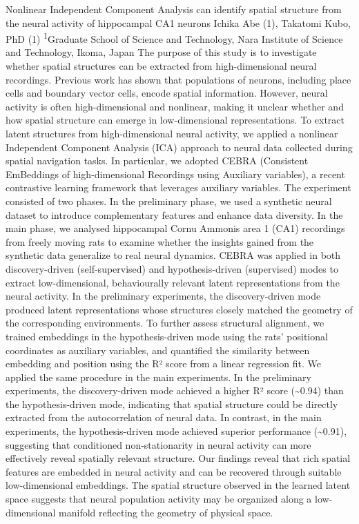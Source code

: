 \makeabstract
{
Nonlinear Independent Component Analysis can identify spatial structure from the neural activity of hippocampal CA1 neurons
}
{
Ichika Abe (1), Takatomi Kubo, PhD (1)
}
{
\textsuperscript{1}Graduate School of Science and Technology, Nara Institute of Science and Technology, Ikoma, Japan
}
{
The purpose of this study is to investigate whether spatial structures can be extracted from high-dimensional neural recordings. Previous work has shown that populations of neurons, including place cells and boundary vector cells, encode spatial information. However, neural activity is often high-dimensional and nonlinear, making it unclear whether and how spatial structure can emerge in low-dimensional representations. To extract latent structures from high-dimensional neural activity, we applied a nonlinear Independent Component Analysis (ICA) approach to neural data collected during spatial navigation tasks. In particular, we adopted CEBRA (Consistent EmBeddings of high-dimensional Recordings using Auxiliary variables), a recent contrastive learning framework that leverages auxiliary variables.
}
{
The experiment consisted of two phases. In the preliminary phase, we used a synthetic neural dataset to introduce complementary features and enhance data diversity. In the main phase, we analysed hippocampal Cornu Ammonis area 1 (CA1) recordings from freely moving rats to examine whether the insights gained from the synthetic data generalize to real neural dynamics. CEBRA was applied in both discovery-driven (self-supervised) and hypothesis-driven (supervised) modes to extract low-dimensional, behaviourally relevant latent representations from the neural activity.
}
{
In the preliminary experiments, the discovery-driven mode produced latent representations whose structures closely matched the geometry of the corresponding environments. To further assess structural alignment, we trained embeddings in the hypothesis-driven mode using the rats’ positional coordinates as auxiliary variables, and quantified the similarity between embedding and position using the R² score from a linear regression fit. We applied the same procedure in the main experiments. In the preliminary experiments, the discovery-driven mode achieved a higher R² score (\textasciitilde{}0.94) than the hypothesis-driven mode, indicating that spatial structure could be directly extracted from the autocorrelation of neural data. In contrast, in the main experiments, the hypothesis-driven mode achieved superior performance (\textasciitilde{}0.91), suggesting that conditioned non-stationarity in neural activity can more effectively reveal spatially relevant structure. 
}
{
Our findings reveal that rich spatial features are embedded in neural activity and can be recovered through suitable low-dimensional embeddings. The spatial structure observed in the learned latent space suggests that neural population activity may be organized along a low-dimensional manifold reflecting the geometry of physical space.
}

\newpage
